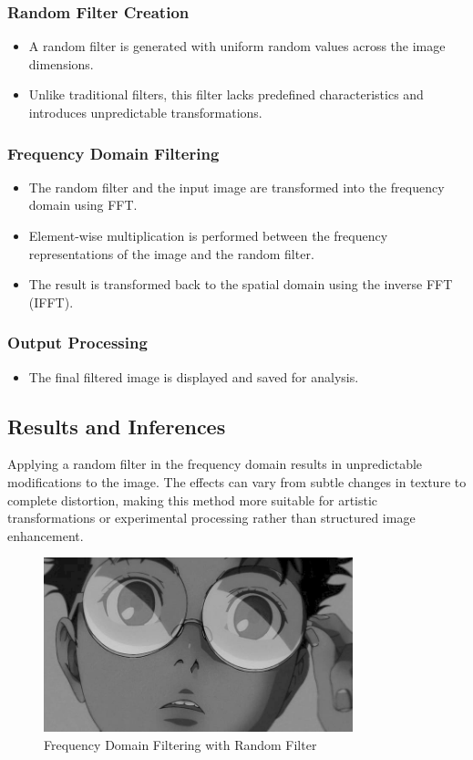 \documentclass[12pt,a4paper]{article}
\begin{document}
\subsubsection{Random Filter Creation}
\begin{itemize}
  \item A random filter is generated with uniform random values across the image dimensions.
  \item Unlike traditional filters, this filter lacks predefined characteristics and introduces unpredictable transformations.
\end{itemize}

\subsubsection{Frequency Domain Filtering}
\begin{itemize}
  \item The random filter and the input image are transformed into the frequency domain using FFT.
  \item Element-wise multiplication is performed between the frequency representations of the image and the random filter.
  \item The result is transformed back to the spatial domain using the inverse FFT (IFFT).
\end{itemize}

\subsubsection{Output Processing}
\begin{itemize}
  \item The final filtered image is displayed and saved for analysis.
\end{itemize}

\subsection{Results and Inferences}
Applying a random filter in the frequency domain results in unpredictable modifications to the image. The effects can vary from subtle changes in texture to complete distortion, making this method more suitable for artistic transformations or experimental processing rather than structured image enhancement.

\begin{figure}[H]
  \centering
  \includegraphics[width=0.8\textwidth]{freq_random/random_filtered_d50_s10.jpg}
  \caption{Frequency Domain Filtering with Random Filter}
  \label{fig:random_filter}
\end{figure}
\end{document}
